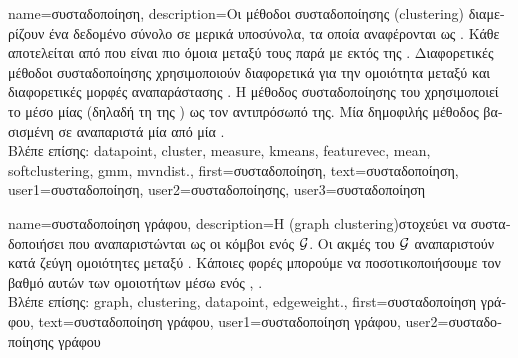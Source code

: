 {name={\foreignlanguage{greek}{συσταδοποίηση}}, 
	description={\foreignlanguage{greek}{Οι μέθοδοι συσταδοποίησης} (clustering) 
		\foreignlanguage{greek}{διαμερίζουν ένα δεδομένο σύ\-νο\-λο}  \foreignlanguage{greek}{σε μερικά υποσύνολα, 
		τα οποία αναφέρονται ως} . \foreignlanguage{greek}{Κάθε}  
		\foreignlanguage{greek}{αποτελείται από}  \foreignlanguage{greek}{που είναι πιο όμοια μεταξύ τους παρά με} 
		 \foreignlanguage{greek}{εκτός της} . \foreignlanguage{greek}{Διαφορετικές μέθοδοι 
		συσταδοποίησης χρησιμοποιούν διαφορετικά}  \foreignlanguage{greek}{για την ομοιότητα μεταξύ} 
		 \foreignlanguage{greek}{και διαφορετικές μορφές αναπαράστασης} . 
		\foreignlanguage{greek}{Η μέθοδος συσταδοποίησης του}  \foreignlanguage{greek}{χρησιμοποιεί το μέσο} 
		 \foreignlanguage{greek}{μίας}  \foreignlanguage{greek}{(δηλαδή τη}  
		\foreignlanguage{greek}{της} ) \foreignlanguage{greek}{ως τον αντιπρόσωπό της. Μία δημοφιλής μέθοδος} 
		 \foreignlanguage{greek}{βασισμένη σε}  \foreignlanguage{greek}{αναπαριστά μία} 
		 \foreignlanguage{greek}{από μία} .
		\\
		\foreignlanguage{greek}{Βλέπε επίσης:} \gls{datapoint}, \gls{cluster}, \gls{measure}, \gls{kmeans}, \gls{featurevec}, \gls{mean}, 
		\gls{softclustering}, \gls{gmm}, \gls{mvndist}.},
	first={\foreignlanguage{greek}{συσταδοποίηση}},
	text={\foreignlanguage{greek}{συσταδοποίηση}},
	user1={\foreignlanguage{greek}{συσταδοποίηση}}, %
	user2={\foreignlanguage{greek}{συσταδοποίησης}}, %
	user3={\foreignlanguage{greek}{συσταδοποίηση}} %
}

{name={\foreignlanguage{greek}{συσταδοποίηση γράφου}},
	description={\foreignlanguage{greek}{Η}   
		(graph clustering)\linebreak \foreignlanguage{greek}{στοχεύει να συσταδοποιήσει}  \foreignlanguage{greek}{που 
		αναπαριστώνται ως οι κόμβοι ενός}  $\mathcal{G}$. \foreignlanguage{greek}{Οι ακμές του $\mathcal{G}$ αναπαριστούν 
		κατά ζεύ\-γη ομοιότητες μεταξύ} . \foreignlanguage{greek}{Κάποιες φορές μπορούμε να 
		ποσοτικοποιήσουμε τον βαθμό αυτών των ομοιοτήτων μέσω ενός}  \cite{Luxburg2007}, \cite{FlowSpecClustering2021}.
		\\
		\foreignlanguage{greek}{Βλέπε επίσης:} \gls{graph}, \gls{clustering}, \gls{datapoint}, \gls{edgeweight}.}, 
	first={\foreignlanguage{greek}{συσταδοποίηση γράφου}},
	text={\foreignlanguage{greek}{συσταδοποίηση γράφου}},
	user1={\foreignlanguage{greek}{συσταδοποίηση γράφου}}, %
    	user2={\foreignlanguage{greek}{συσταδοποίησης γράφου}} %
}

